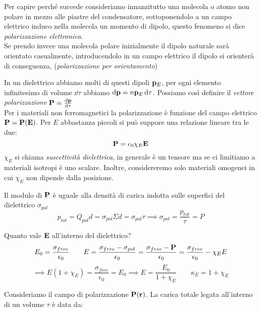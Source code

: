 \documentclass[12pt,a4paper]{article}
\begin{document}
Per capire perché succede consideriamo innanzitutto una molecola o atomo non polare in mezzo alle piastre del condensatore,
sottoponendolo a un campo elettrico induco nella molecola un momento di dipolo, questo fenomeno si dice \textit{polarizzazione elettronica}.
\\Se prendo invece una molecola polare inizialmente il dipolo naturale sarà orientato casualmente, introducendolo in un campo elettrico
il dipolo si orienterà di conseguenza, (\textit{polarizzazione per orientamento})


In un dielettrico abbiamo molti di questi dipoli $\vb{p}_E$, per ogni elemento infinitesimo di volume $\dd{\tau}$ abbiamo $\dd{\vb{p}}= n \vb{p}_E\dd{\tau}$.
Possiamo così definire il \textit{vettore polarizzazione} $\vb{P}=\dv{\vb{p}}{\tau}$
\\Per i materiali non ferromagnetici la polarizzazione è funzione del campo elettrico $\vb{P}= \vb{P}(\vb{E})$. Per $E$ abbastanza piccoli
si può suppore una relazione lineare tra le due:
\begin{equation*}
    \vb{P}= \epsilon_0\chi_E\vb{E}
\end{equation*}
$\chi_E$ si chiama \textit{suscettività dielettrica}, in generale è un tensore ma se ci limitiamo a materiali isotropi è uno scalare.
Inoltre, considereremo solo materiali omogenei in cui $\chi_E$ non dipende dalla posizione.

Il modulo di $\vb{P}$ è uguale alla densità di carica indotta sulle superfici del dielettrico $\sigma_{pol}$
\begin{equation*}
    p_{tot}= Q_{pol}d= \sigma_{pol}\Sigma d= \sigma_{pol}\tau \implies \sigma_{pol}= \frac{p_{tot}}{\tau}= P
\end{equation*}

Quanto vale $\vb{E}$ all'interno del dielettrico?
\begin{equation*}
    E_0= \frac{\sigma_{free}}{\epsilon_0}\qquad E = \frac{\sigma_{free}-\sigma_{pol}}{\epsilon_0}=\frac{\sigma_{free}-\vb{P}}{\epsilon_0}
    = \frac{\sigma_{free}}{\epsilon_0}-\chi_EE 
\end{equation*}
\begin{equation*}
    \implies E(1+ \chi_E)= \frac{\sigma_{free}}{\epsilon_0}= E_0 \implies E = \frac{E_0}{1+ \chi_E}\qquad \kappa_E= 1+ \chi_E
\end{equation*}

Consideriamo il campo di polarizzazione $\vb{P}(\vb{r})$. La carica totale legata all'interno di un volume $\tau$ è data da:
\end{document}
